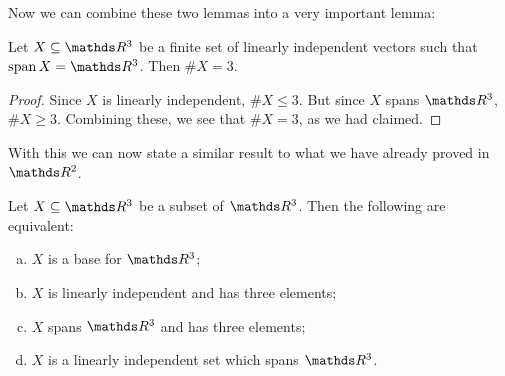 Now we can combine these two lemmas into a very important lemma:

\begin{lemma}
	Let $X\subseteq\R^3$ be a finite set of linearly independent vectors such that $\spen X=\R^3$. Then $\#X=3$.
\end{lemma}
\begin{proof}
	Since $X$ is linearly independent, $\#X\leq 3$. But since $X$ spans $\R^3$, $\#X\geq 3$. Combining these, we see that $\#X=3$, as we had claimed.
\end{proof}

With this we can now state a similar result to what we have already proved in $\R^2$.

\begin{theorem}
	Let $X\subseteq\R^3$ be a subset of $\R^3$. Then the following are equivalent:
	\begin{enumerate}[a)]
		\item $X$ is a base for $\R^3$;
		\item $X$ is linearly independent and has three elements;
		\item $X$ spans $\R^3$ and has three elements;
		\item $X$ is a linearly independent set which spans $\R^3$.
	\end{enumerate}
\end{theorem}
